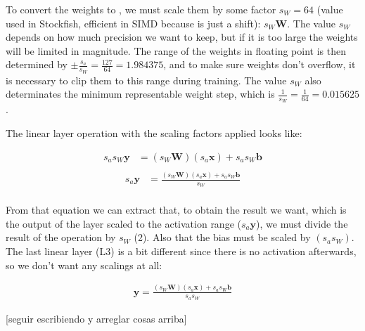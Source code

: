 To convert the weights to , we must scale them by some factor $s_W=64$ (value used in Stockfish, efficient in SIMD because is just a shift): $s_W \bm{W}$. The value $s_W$ depends on how much precision we want to keep, but if it is too large the weights will be limited in magnitude. The range of the weights in floating point is then determined by $\pm \frac{s_a}{s_W}=\frac{127}{64}=1.984375$, and to make sure weights don't overflow, it is necessary to clip them to this range during training. The value $s_W$ also determinates the minimum representable weight step, which is $\frac{1}{s_W}=\frac{1}{64}=0.015625$.

The linear layer operation with the scaling factors applied looks like:

\begin{equation}
\begin{aligned}
s_a s_W \bm{y} &= (s_W \bm{W}) (s_a \bm{x}) + s_a s_W \bm{b} \\
\end{aligned}
\end{equation}
\begin{equation}
\begin{aligned}
s_a \bm{y} &= \frac{(s_W \bm{W}) (s_a \bm{x}) + s_a s_W \bm{b}}{s_W} \\
\end{aligned}
\end{equation}

From that equation we can extract that, to obtain the result we want, which is the output of the layer scaled to the activation range ($s_a \bm{y}$), we must divide the result of the operation by $s_W$ (2). Also that the bias must be scaled by $(s_a s_W)$. \\

The last linear layer (L3) is a bit different since there is no activation afterwards, so we don't want any scalings at all:

\begin{equation}
\begin{aligned}
\bm{y} = \frac{(s_W \bm{W}) (s_a \bm{x}) + s_a s_W \bm{b}}{s_a s_W}
\end{aligned}
\end{equation}

[seguir escribiendo y arreglar cosas arriba]


